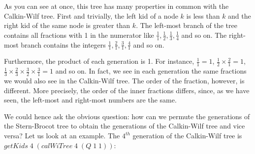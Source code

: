 \documentclass[tikz]{scrreprt}
\newcommand{\Conid}[1]{\mathit{#1}}
\newcommand{\Varid}[1]{\mathit{#1}}
\begin{document}
\begin{center}
\end{center}

As you can see at once, this tree has many properties
in common with the Calkin-Wilf tree.
First and trivially, the left kid of a node $k$ is less
than $k$ and the right kid of the same node is greater than $k$.
The left-most branch of the tree contains all fractions
with 1 in the numerator like
$\frac{1}{1},
 \frac{1}{2},
 \frac{1}{3},
 \frac{1}{4}$ and so on.
The right-most branch contains the integers 
$\frac{1}{1},
 \frac{2}{1},
 \frac{3}{1},
 \frac{4}{1}$ and so on.

Furthermore, the product of each generation is 1.
For instance,
$\frac{1}{1} = 1$,
$\frac{1}{2} \times \frac{2}{1} = 1$,
$\frac{1}{3} \times \frac{2}{3} \times
 \frac{3}{2} \times \frac{3}{1} = 1$ and so on.
In fact, we see in each generation the same fractions
we would also see in the Calkin-Wilf tree.
The order of the fraction, however, is different.
More precisely, the order of the inner fractions
differs, since, as we have seen, 
the left-most and right-most numbers are the same.

We could hence ask the obvious question:
how can we permute the generations of the Stern-Brocot tree
to obtain the generations of the Calkin-Wilf tree and vice versa?
Let us look at an example.
The $4^{th}$ generation of the Calkin-Wilf tree is\\
\ensuremath{\Varid{getKids}\;\mathrm{4}\;(\Varid{calWiTree}\;\mathrm{4}\;(\Conid{Q}\;\mathrm{1}\;\mathrm{1}))}: 
\end{document}
